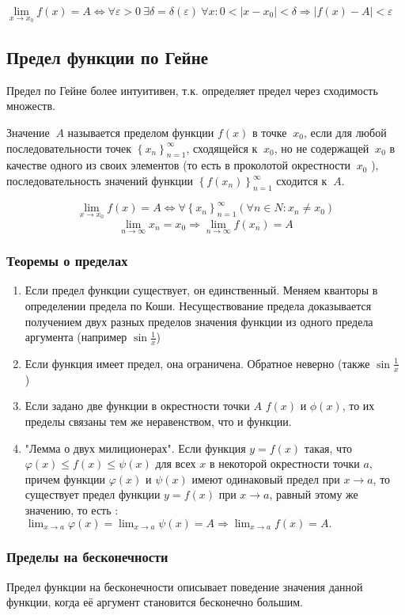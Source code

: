 $\lim\limits_{x \to x_0} f \left( x \right) = A \Leftrightarrow \forall \varepsilon > 0 ~ \exists \delta = \delta \left( \varepsilon \right) ~ \forall x \colon 0 < \left| x - x_0 \right| < \delta \Rightarrow \left| f \left( x \right) - A \right| < \varepsilon$

\subsection{Предел функции по Гейне}

Предел по Гейне более интуитивен, т.к. определяет предел через сходимость множеств.

Значение $~A$ называется пределом функции $f \left( x \right)$ в точке $~x_0$, если для любой последовательности точек $\left\{ x_n \right\}_{n=1}^{\infty}$, сходящейся к $~x_0$, но не содержащей $~x_0$ в качестве одного из своих элементов (то есть в проколотой окрестности $~x_0$ ), последовательность значений функции $\left\{ f \left( x_n \right) \right\}_{n=1}^{\infty}$ сходится к $~A$.

$$
\lim\limits_{x \to x_0} f \left( x \right) = A \Leftrightarrow \forall \left\{ x_n \right\}_{n = 1}^{\infty} \left( \forall n \in N \colon x_n \neq x_0 \right) 
$$
$$
\lim\limits_{n \to \infty} x_n = x_0 \Rightarrow \lim_{n \to \infty} f \left( x_n \right) = A
$$

\subsubsection{Теоремы о пределах}

\begin{enumerate}
\item 
Если предел функции существует, он единственный.
Меняем кванторы в определении предела по Коши.
Несуществование предела доказывается получением двух разных пределов значения функции из одного предела аргумента (например $\sin \frac{1}{x}$)

\item 
Если функция имеет предел, она ограничена. Обратное неверно (также $\sin \frac{1}{x} $ )

\item 
Если задано две функции в окрестности точки $ A $ $ f(x) $ и $ \phi(x) $,
то их пределы связаны тем же неравенством, что и функции.

\item
"Лемма о двух милиционерах". Если функция $y=f(x)$ такая, что $\varphi(x)\leqslant f(x)\leqslant\psi(x)$ для всех $x$ в некоторой окрестности точки $a$, причем функции $\varphi(x)$ и $\psi(x)$ имеют одинаковый предел при $x\to a$, то существует предел функции $y=f(x)$ при $x\to a$, равный этому же значению, то есть
: $\lim_{x\to a}\varphi(x)=\lim_{x\to a}\psi(x)=A\Rightarrow\lim_{x\to a}f(x)=A.$
\end{enumerate}


\subsubsection{Пределы на бесконечности}

Предел функции на бесконечности описывает поведение значения данной функции, когда её аргумент становится бесконечно большим.




